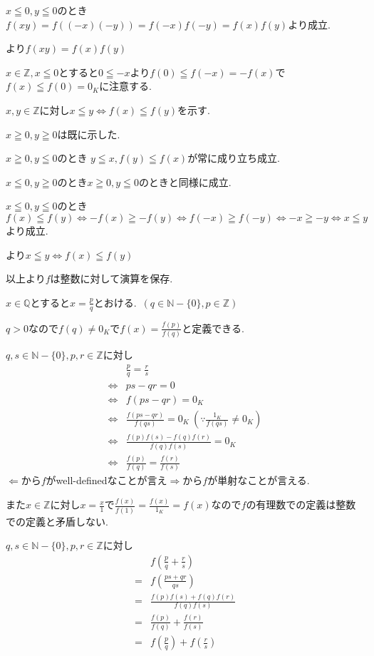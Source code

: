 \documentclass{jsarticle}
\begin{document}
$x\leqq 0,y\leqq 0$のとき$f(xy) = f((-x)(-y))=f(-x)f(-y)=f(x)f(y)$より成立.

より$f(xy)=f(x)f(y)$

$x\in \mathbb{Z},x \leqq 0$とすると$0 \leqq -x$より$f(0)\leqq f(-x)=-f(x)$で$f(x)\leqq f(0)=0_K$に注意する.

$x,y\in\mathbb{Z}$に対し$x\leqq y\Leftrightarrow f(x)\leqq f(y)$を示す.

$x\geqq 0,y\geqq 0$は既に示した.

$x\geqq 0,y\leqq 0$のとき
$y\leqq x,f(y)\leqq f(x)$が常に成り立ち成立.

$x\leqq 0,y\geqq 0$のとき$x\geqq 0,y\leqq 0$のときと同様に成立.

$x\leqq 0,y\leqq 0$のとき
\[f(x)\leqq f(y)\Leftrightarrow -f(x)\geqq -f(y) \Leftrightarrow f(-x)\geqq f(-y) \Leftrightarrow -x \geqq -y \Leftrightarrow x\leqq y\]
より成立.

より$x\leqq y\Leftrightarrow f(x)\leqq f(y)$

以上より$f$は整数に対して演算を保存.

$x\in \mathbb{Q}$とすると$x=\frac{p}{q}$とおける.\ $(q\in \mathbb{N}-\{0\},p\in\mathbb{Z})$

$q>0$なので$f(q)\neq 0_K$で$f(x) = \frac{f(p)}{f(q)}$と定義できる.

$q,s\in \mathbb{N}-\{0\},p,r\in\mathbb{Z}$に対し
\begin{align*}
&\frac{p}{q}=\frac{r}{s}\\
\Leftrightarrow & ps-qr=0\\
\Leftrightarrow & f(ps-qr)=0_K\\
\Leftrightarrow & \frac{f(ps-qr)}{f(qs)}=0_K \ (\because \frac{1_K}{f(qs)}\neq 0_K)\\
\Leftrightarrow & \frac{f(p)f(s)-f(q)f(r)}{f(q)f(s)}=0_K\\
\Leftrightarrow & \frac{f(p)}{f(q)}=\frac{f(r)}{f(s)}
\end{align*}
$\Leftarrow$から$f$がwell-definedなことが言え$\Rightarrow$から$f$が単射なことが言える.

また$x\in\mathbb{Z}$に対し$x=\frac{x}{1}$で$\frac{f(x)}{f(1)}=\frac{f(x)}{1_K}=f(x)$なので$f$の有理数での定義は整数での定義と矛盾しない.

$q,s\in \mathbb{N}-\{0\},p,r\in\mathbb{Z}$に対し
\begin{align*}
&f(\frac{p}{q}+\frac{r}{s})\\
= & f(\frac{ps+qr}{qs})\\
= & \frac{f(p)f(s)+f(q)f(r)}{f(q)f(s)}\\
= & \frac{f(p)}{f(q)}+\frac{f(r)}{f(s)}\\
= & f(\frac{p}{q})+f(\frac{r}{s})
\end{align*}
\end{document}
